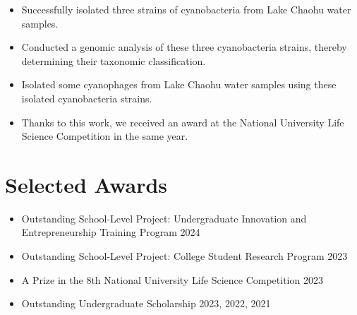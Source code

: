 \documentclass{resume}
\begin{document}
    \begin{itemize}
      \item Successfully isolated three strains of cyanobacteria from Lake Chaohu water samples.
      \item Conducted a genomic analysis of these three cyanobacteria strains, thereby determining their taxonomic classification.
      \item Isolated some cyanophages from Lake Chaohu water samples using these isolated cyanobacteria strains.
      \item Thanks to this work, we received an award at the National University Life Science Competition in the same year.
    \end{itemize}

\section{Selected Awards}
  \begin{itemize}
      \item Outstanding School-Level Project: Undergraduate Innovation and Entrepreneurship Training Program \hfill 2024
      \item Outstanding School-Level Project: College Student Research Program \hfill 2023
      \item A Prize in the 8th National University Life Science Competition \hfill 2023
      \item Outstanding Undergraduate Scholarship  \hfill 2023, 2022, 2021
  \end{itemize}
\end{document}
